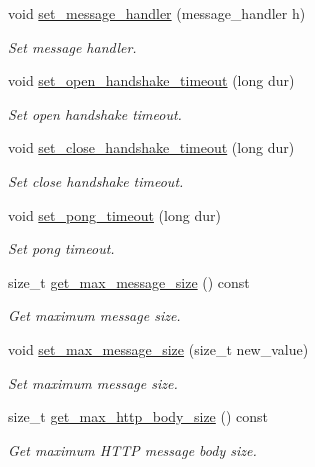 \begin{DoxyCompactItemize}
void \mbox{\hyperlink{classwebsocketpp_1_1connection_a107e754227c828582779b906654743fe}{set\+\_\+message\+\_\+handler}} (message\+\_\+handler h)
\begin{DoxyCompactList}\small\item\em Set message handler. \end{DoxyCompactList}\item 
void \mbox{\hyperlink{classwebsocketpp_1_1connection_ad5a666fe1144dc68b1bae3bcc615e1ed}{set\+\_\+open\+\_\+handshake\+\_\+timeout}} (long dur)
\begin{DoxyCompactList}\small\item\em Set open handshake timeout. \end{DoxyCompactList}\item 
void \mbox{\hyperlink{classwebsocketpp_1_1connection_a3bf932388a128a7b719c45b945bffaad}{set\+\_\+close\+\_\+handshake\+\_\+timeout}} (long dur)
\begin{DoxyCompactList}\small\item\em Set close handshake timeout. \end{DoxyCompactList}\item 
void \mbox{\hyperlink{classwebsocketpp_1_1connection_ab9a905ac6a4f0f8546011b8f8a531563}{set\+\_\+pong\+\_\+timeout}} (long dur)
\begin{DoxyCompactList}\small\item\em Set pong timeout. \end{DoxyCompactList}\item 
size\+\_\+t \mbox{\hyperlink{classwebsocketpp_1_1connection_af7739a5097ae6562bc9b0880731a2857}{get\+\_\+max\+\_\+message\+\_\+size}} () const
\begin{DoxyCompactList}\small\item\em Get maximum message size. \end{DoxyCompactList}\item 
void \mbox{\hyperlink{classwebsocketpp_1_1connection_a522286bf83373f87ddebf93b732abffc}{set\+\_\+max\+\_\+message\+\_\+size}} (size\+\_\+t new\+\_\+value)
\begin{DoxyCompactList}\small\item\em Set maximum message size. \end{DoxyCompactList}\item 
size\+\_\+t \mbox{\hyperlink{classwebsocketpp_1_1connection_a9a050215a9f1d7652bcd8c543ae5f38c}{get\+\_\+max\+\_\+http\+\_\+body\+\_\+size}} () const
\begin{DoxyCompactList}\small\item\em Get maximum H\+T\+TP message body size. \end{DoxyCompactList}\item 

\end{DoxyCompactItemize}
